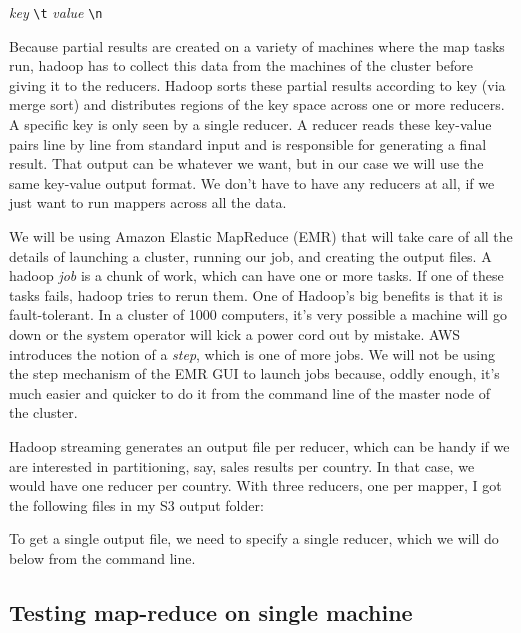 \begin{fullwidth}
{\em key} \verb+\t+ {\em value} \verb+\n+

Because partial results are created on a variety of machines where the map tasks run, hadoop has to collect this data  from the machines of the cluster before giving it to the reducers. Hadoop sorts these partial results according to key (via merge sort) and distributes regions of the key space across one or more reducers. A specific key is only seen by a single reducer. A reducer reads these key-value pairs line by line from standard input and is responsible for generating a final result.  That output can be whatever we want, but in our case we will use the same key-value output format. 
We don't have to have any reducers at all, if we just want to run mappers across all the data.

We will be using Amazon Elastic MapReduce (EMR) that will take care of all the details of launching a cluster, running our job, and creating the output files.  A hadoop {\em job} is a chunk of work, which can have one or more tasks. If one of these tasks fails, hadoop tries to rerun them.  One of Hadoop's big benefits is that it is fault-tolerant. In a cluster of 1000 computers, it's very possible a machine will go down or the system operator will kick a power cord out by mistake. AWS introduces the notion of a {\em step}, which is one of more jobs.  We will not be using the step mechanism of the EMR GUI to launch jobs because, oddly enough, it's much easier and quicker to do it from the command line of the master node of the cluster.

Hadoop streaming generates an output file per reducer, which can be handy if we are interested in partitioning, say, sales results per country. In that case, we would have one reducer per country.  With three reducers, one per mapper, I got the following files in my S3 output folder:


To get a single output file, we need to specify a single reducer, which we will do below from the command line.

\subsection{Testing map-reduce on single machine}


\end{fullwidth}
